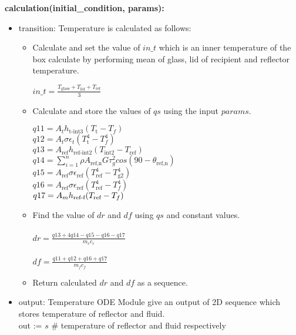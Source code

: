 \documentclass[12pt, titlepage]{article}
\begin{document}
\noindent \textbf{calculation(initial\_condition, params):}
\begin{itemize}
\item transition: Temperature is calculated as follows: 
    \begin{itemize}
        \item Calculate and set the value of $in\_t$ which is an inner temperature of the box calculate by performing mean of glass, lid of recipient and reflector temperature. 
        \begin{center}
            $in\_t = \frac{T_\text{glass} + T_\text{lid} + T_\text{ref}}{3}$
        \end{center}
        \item Calculate and store the values of $qs$ using the input $params$. 
    
            $q11 = A_t h_\text{t-int3}(T_\text{t} - T_f)$ \\ 
            $q12 = A_t \sigma \epsilon_t (T_\text{t}^4 - T_f^4)$ \\ 
            $q13 = A_\text{ref} h_\text{ref-int2}(T_\text{int2} - T_\text{ref})$ \\ 
            $q14 = \sum_{i=1}^n \rho A_\text{ref,n} G \tau_g^2 cos (90 - \theta_\text{ref,n})$ \\
            $q15 = A_\text{ref} \sigma \epsilon_\text{ref} (T^4_\text{ref} - T^4_\text{g2})$ \\
            $q16 = A_\text{ref} \sigma \epsilon_\text{ref} (T^4_\text{ref} - T^4_f)$ \\
            $q17 = A_m h_\text{\text{ref}-f}(T_\text{ref} - T_f)$ \\
            
        \item Find the value of $dr$ and $df$ using $qs$ and constant values. \\ \\ 
        $dr = \frac{q13 + 4 q14 - q15 - q16 - q17}{m_r  c_r}$ \\  \\
        $df = \frac{q11 + q12 + q16 + q17}{m_f  c_f}$
        \item Return calculated $dr$ and $df$ as a sequence. 
    \end{itemize}
\item output: 
    Temperature ODE Module give an output of 2D sequence which stores temperature of reflector and fluid. \\  
    out := $s$ \# temperature of reflector and fluid respectively  


\end{itemize}
\end{document}
